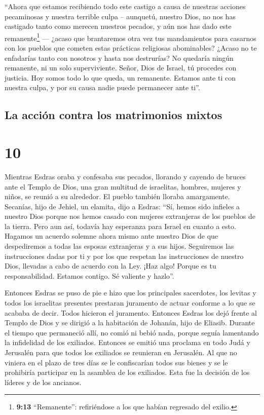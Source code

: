  ``Ahora que estamos recibiendo todo este castigo a causa
de nuestras acciones pecaminosas y nuestra terrible culpa -- aunquetú,
nuestro Dios, no nos has castigado tanto como merecen nuestros pecados,
y aún nos has dado este remanente\footnote{\textbf{9:13} ``Remanente'':
  refiriéndose a los que habían regresado del exilio.} ---
 ¿acaso que brantaremos otra vez tus mandamientos para
casarnos con los pueblos que cometen estas prácticas religiosas
abominables? ¿Acaso no te enfadarías tanto con nosotros y hasta nos
destrurías? No quedaría ningún remanente, ni un solo superviviente.
 Señor, Dios de Israel, tú procedes con justicia. Hoy
somos todo lo que queda, un remanente. Estamos ante ti con nuestra
culpa, y por su causa nadie puede permanecer ante ti''.

\hypertarget{la-acciuxf3n-contra-los-matrimonios-mixtos}{%
\subsection{La acción contra los matrimonios
mixtos}\label{la-acciuxf3n-contra-los-matrimonios-mixtos}}

\hypertarget{section-9}{%
\section{10}\label{section-9}}

 Mientras Esdras oraba y confesaba sus pecados, llorando y
cayendo de bruces ante el Templo de Dios, una gran multitud de
israelitas, hombres, mujeres y niños, se reunió a su alrededor. El
pueblo también lloraba amargamente.  Secanías, hijo de
Jehiel, un elamita, dijo a Esdras: ``Sí, hemos sido infieles a nuestro
Dios porque nos hemos casado con mujeres extranjeras de los pueblos de
la tierra. Pero aun así, todavía hay esperanza para Israel en cuanto a
esto.  Hagamos un acuerdo solemne ahora mismo ante nuestro
Dios de que despediremos a todas las esposas extranjeras y a sus hijos.
Seguiremos las instrucciones dadas por ti y por los que respetan las
instrucciones de nuestro Dios, llevadas a cabo de acuerdo con la Ley.
 ¡Haz algo! Porque es tu responsabilidad. Estamos contigo.
Sé valiente y hazlo''.

 Entonces Esdras se puso de pie e hizo que los principales
sacerdotes, los levitas y todos los israelitas presentes prestaran
juramento de actuar conforme a lo que se acababa de decir. Todos
hicieron el juramento.  Entonces Esdras los dejó frente al
Templo de Dios y se dirigió a la habitación de Johanán, hijo de Eliasib.
Durante el tiempo que permaneció allí, no comió ni bebió nada, porque
seguía lamentando la infidelidad de los exiliados. 
Entonces se emitió una proclama en todo Judá y Jerusalén para que todos
los exiliados se reunieran en Jerusalén.  Al que no
viniera en el plazo de tres días se le confiscarían todos sus bienes y
se le prohibiría participar en la asamblea de los exiliados. Esta fue la
decisión de los líderes y de los ancianos.

